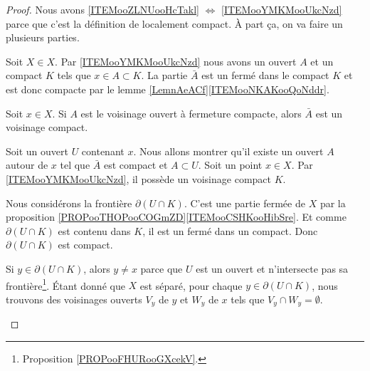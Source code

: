 \begin{proof}
	Nous avons \ref{ITEMooZLNUooHcTakl} \( \Leftrightarrow\) \ref{ITEMooYMKMooUkcNzd} parce que c'est la définition de localement compact. À part ça, on va faire un plusieurs parties.
	\begin{subproof}
		\spitem[\ref{ITEMooYMKMooUkcNzd} \( \Rightarrow\) \ref{ITEMooBTECooDDsTuo}]
		Soit \( X\in X\). Par \ref{ITEMooYMKMooUkcNzd} nous avons un ouvert \( A\) et un compact \( K\) tels que \( x\in A\subset K\). La partie \( \bar A\) est un fermé dans le compact \( K\) et est donc compacte par le lemme \ref{LemnAeACf}\ref{ITEMooNKAKooQoNddr}.

		\spitem[\ref{ITEMooBTECooDDsTuo} \( \Rightarrow\) \ref{ITEMooYMKMooUkcNzd}]
		Soit \( x\in X\). Si \( A\) est le voisinage ouvert à fermeture compacte, alors \( \bar A\) est un voisinage compact.

		\spitem[\ref{ITEMooYMKMooUkcNzd} \( \Rightarrow\) \ref{ITEMooXYYHooTCZMJr}]
		Soit un ouvert \( U\) contenant \( x\). Nous allons montrer qu'il existe un ouvert \( A\) autour de \( x\) tel que \( \bar A\) est compact et \( A\subset U\). Soit un point \( x\in X\). Par \ref{ITEMooYMKMooUkcNzd}, il possède un voisinage compact \( K\).

		Nous considérons la frontière \( \partial(U\cap K)\). C'est une partie fermée de \( X\) par la proposition \ref{PROPooTHOPooCOGmZD}\ref{ITEMooCSHKooHibSre}. Et comme \( \partial(U\cap K)\) est contenu dans \( K\), il est un fermé dans un compact. Donc \( \partial(U\cap K)\) est compact.

		Si \( y\in\partial(U\cap K)\), alors \( y\neq x\) parce que \( U\) est un ouvert et n'intersecte pas sa frontière\footnote{Proposition \ref{PROPooFHURooGXcekV}.}. Étant donné que \( X\) est séparé, pour chaque \( y\in \partial(U\cap K)\), nous trouvons des voisinages ouverts \( V_y\) de \( y\) et \( W_y\) de \( x\) tels que \( V_y\cap W_y=\emptyset\).


\end{subproof}
\end{proof}
